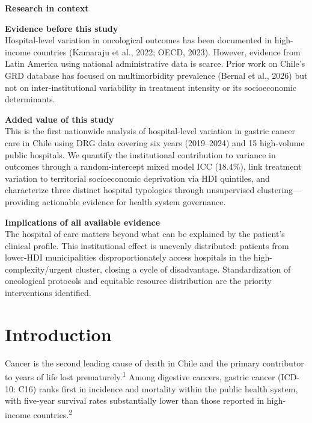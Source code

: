 \documentclass[10pt,twocolumn]{article}
\begin{document}
\begin{mdframed}[style=ricbox]
{\fontsize{8.5}{11}\selectfont\bfseries Research in context\par}
\vspace{4pt}
{\fontsize{8}{10}\selectfont
\textbf{Evidence before this study}\\
Hospital-level variation in oncological outcomes has been documented in high-income
countries (Kamaraju et al., 2022; OECD, 2023). However, evidence from Latin America
using national administrative data is scarce. Prior work on Chile's GRD database has
focused on multimorbidity prevalence (Bernal et al., 2026) but not on inter-institutional
variability in treatment intensity or its socioeconomic determinants.

\vspace{4pt}
\textbf{Added value of this study}\\
This is the first nationwide analysis of hospital-level variation in gastric cancer care in
Chile using DRG data covering six years (2019–2024) and 15 high-volume public hospitals.
We quantify the institutional contribution to variance in outcomes through a random-intercept
mixed model ICC (18.4\%), link treatment variation to territorial socioeconomic deprivation
via HDI quintiles, and characterize three distinct hospital typologies through unsupervised
clustering—providing actionable evidence for health system governance.

\vspace{4pt}
\textbf{Implications of all available evidence}\\
The hospital of care matters beyond what can be explained by the patient's clinical profile.
This institutional effect is unevenly distributed: patients from lower-HDI municipalities
disproportionately access hospitals in the high-complexity/urgent cluster, closing a
cycle of disadvantage. Standardization of oncological protocols and equitable resource
distribution are the priority interventions identified.
}
\end{mdframed}

\section{Introduction}

Cancer is the second leading cause of death in Chile and the primary contributor to
years of life lost prematurely.\textsuperscript{1} Among digestive cancers, gastric
cancer (ICD-10: C16) ranks first in incidence and mortality within the public health
system, with five-year survival rates substantially lower than those reported in
high-income countries.\textsuperscript{2}
\end{document}
